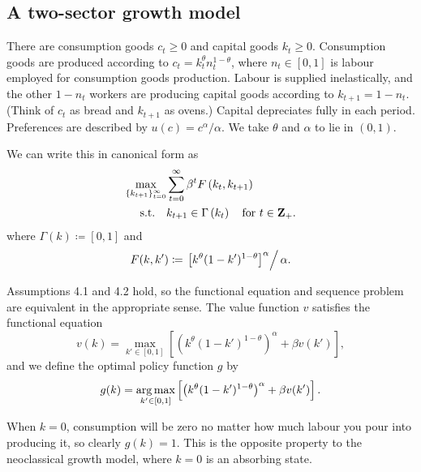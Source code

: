 \documentclass[11pt,letterpaper,reqno,oneside]{article}
\begin{document}
\subsection{A two-sector growth model}
\label{sec:05Oct2015:two-sector_growth_model}

There are consumption goods $c_t \geq 0$ and capital goods $k_t\geq 0$. Consumption goods are produced according to $c_t = k_t^\theta n_t^{1-\theta}$, where $n_t \in [0,1]$ is labour employed for consumption goods production. Labour is supplied inelastically, and the other $1-n_t$ workers are producing capital goods according to $k_{t+1} = 1-n_t$. (Think of $c_t$ as bread and $k_{t+1}$ as ovens.) Capital depreciates fully in each period. Preferences are described by $u(c) = c^\alpha / \alpha$. We take $\theta$ and $\alpha$ to lie in $(0,1)$.

We can write this in canonical form as
%
\begin{align*}
	\max_{\{k_{t+1}\}_{t=0}^\infty} 
	& \sum_{t=0}^\infty \beta^t F \left( k_t,k_{t+1} \right) 
	\\
	\text{s.t.}\quad
	& k_{t+1} \in \Gamma \left( k_t \right) \quad\text{for $t \in \mathbf{Z}_+$} .
\end{align*}
%
where $\Gamma(k) \coloneqq [0,1]$ and
%
\begin{equation*}
	F(k,k') \coloneqq \left. \left[ k^\theta (1-k')^{1-\theta} \right]^\alpha \right/ \alpha .
\end{equation*}


Assumptions 4.1 and 4.2 hold, so the functional equation and sequence problem are equivalent in the appropriate sense. The value function $v$ satisfies the functional equation 
%
\begin{equation*}
	v(k) = \max_{k' \in [0,1]} 
	\left[ \left( k^\theta (1-k')^{1-\theta} \right)^\alpha + \beta v(k') \right] ,
\end{equation*}
%
and we define the optimal policy function $g$ by
%
\begin{equation*}
	g(k) = \operatorname*{arg\,max}_{k' \in [0,1]} 
	\left[ \left( k^\theta (1-k')^{1-\theta} \right)^\alpha + \beta v(k') \right] .
\end{equation*}

When $k=0$, consumption will be zero no matter how much labour you pour into producing it, so clearly $g(k)=1$. This is the opposite property to the neoclassical growth model, where $k=0$ is an absorbing state.
\end{document}
